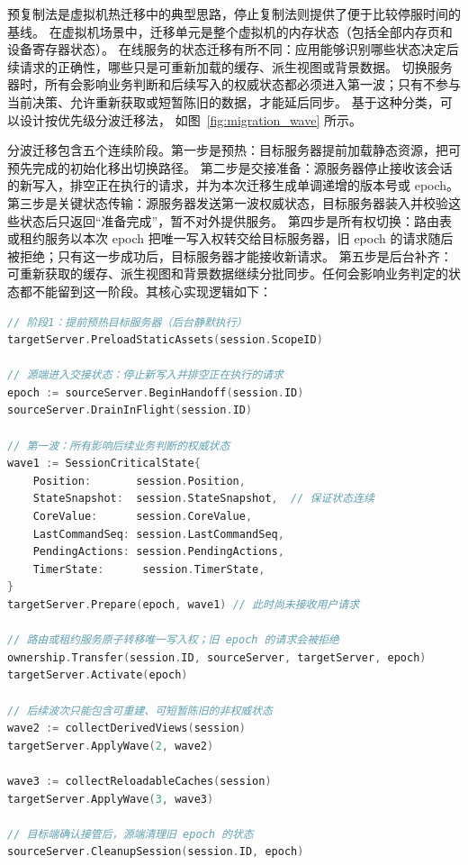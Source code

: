 预复制法是虚拟机热迁移中的典型思路，停止复制法则提供了便于比较停服时间的基线。
在虚拟机场景中，迁移单元是整个虚拟机的内存状态（包括全部内存页和设备寄存器状态）。
在线服务的状态迁移有所不同：应用能够识别哪些状态决定后续请求的正确性，哪些只是可重新加载的缓存、派生视图或背景数据。
切换服务器时，所有会影响业务判断和后续写入的权威状态都必须进入第一波；只有不参与当前决策、允许重新获取或短暂陈旧的数据，才能延后同步。
基于这种分类，可以设计按优先级分波迁移法，
如图~\ref{fig:migration_wave} 所示。

分波迁移包含五个连续阶段。第一步是预热：目标服务器提前加载静态资源，把可预先完成的初始化移出切换路径。
第二步是交接准备：源服务器停止接收该会话的新写入，排空正在执行的请求，并为本次迁移生成单调递增的版本号或 epoch。
第三步是关键状态传输：源服务器发送第一波权威状态，目标服务器装入并校验这些状态后只返回“准备完成”，暂不对外提供服务。
第四步是所有权切换：路由表或租约服务以本次 epoch 把唯一写入权转交给目标服务器，旧 epoch 的请求随后被拒绝；只有这一步成功后，目标服务器才能接收新请求。
第五步是后台补齐：可重新获取的缓存、派生视图和背景数据继续分批同步。任何会影响业务判定的状态都不能留到这一阶段。其核心实现逻辑如下：

\begin{tcolorbox}[title=按优先级分波迁移的核心逻辑]
\begin{lstlisting}[style=codeblock, language=go]
// 阶段1：提前预热目标服务器（后台静默执行）
targetServer.PreloadStaticAssets(session.ScopeID)

// 源端进入交接状态：停止新写入并排空正在执行的请求
epoch := sourceServer.BeginHandoff(session.ID)
sourceServer.DrainInFlight(session.ID)

// 第一波：所有影响后续业务判断的权威状态
wave1 := SessionCriticalState{
    Position:       session.Position,
    StateSnapshot:  session.StateSnapshot,  // 保证状态连续
    CoreValue:      session.CoreValue,
    LastCommandSeq: session.LastCommandSeq,
    PendingActions: session.PendingActions,
    TimerState:      session.TimerState,
}
targetServer.Prepare(epoch, wave1) // 此时尚未接收用户请求

// 路由或租约服务原子转移唯一写入权；旧 epoch 的请求会被拒绝
ownership.Transfer(session.ID, sourceServer, targetServer, epoch)
targetServer.Activate(epoch)

// 后续波次只能包含可重建、可短暂陈旧的非权威状态
wave2 := collectDerivedViews(session)
targetServer.ApplyWave(2, wave2)

wave3 := collectReloadableCaches(session)
targetServer.ApplyWave(3, wave3)

// 目标端确认接管后，源端清理旧 epoch 的状态
sourceServer.CleanupSession(session.ID, epoch)
\end{lstlisting}
\end{tcolorbox}

